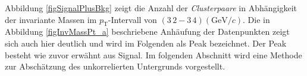 \newline
Abbildung \ref{figSignalPlusBkg} zeigt die Anzahl der \textit{Clusterpaare} in Abhängigkeit der invariante Massen im $p_{\text{T}}$-Intervall von $(3\,2 - 3\,4)(\text{GeV}/c)$.
Die in Abbildung \ref{figInvMassPt_a} beschriebene Anhäufung der Datenpunkten zeigt sich auch hier deutlich und wird im Folgenden als Peak bezeichnet.
Der Peak besteht wie zuvor erwähnt aus Signal.
\newline
Im folgenden Abschnitt wird eine Methode zur Abschätzung des unkorrelierten Untergrunds vorgestellt. 